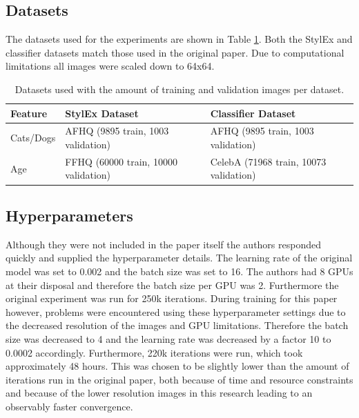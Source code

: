 \subsection{Datasets}

The datasets used for the experiments are shown in Table \ref{tab:datasets}. Both the StylEx and classifier datasets match those used in the original paper. Due to computational limitations all images were scaled down to 64x64.


\begin{table}[H] \centering
\begin{tabular}{|l|l|l|}
\hline
Feature & StylEx Dataset & Classifier Dataset \\
\hline
Cats/Dogs & AFHQ (9895 train, 1003 validation)\cite{AFHQ} & AFHQ (9895 train, 1003 validation) \\
\hline
Age & FFHQ (60000 train, 10000 validation) \cite{Karras_2019_CVPR} & CelebA (71968 train,  10073 validation) \cite{liu2015faceattributes} \\
\hline
\end{tabular}
\caption{Datasets used with the amount of training and validation images per dataset.}
\label{tab:datasets}
\end{table}

\subsection{Hyperparameters}
Although they were not included in the paper itself the authors responded quickly and supplied the hyperparameter details. The learning rate of the original model was set to 0.002 and the batch size was set to 16. The authors had 8 GPUs at their disposal and therefore the batch size per GPU was 2. Furthermore the original experiment was run for 250k iterations. During training for this paper however, problems were encountered using these hyperparameter settings due to the decreased resolution of the images and GPU limitations. Therefore the batch size was decreased to 4 and the learning rate was decreased by a factor 10 to 0.0002 accordingly. Furthermore, 220k iterations were run, which took approximately 48 hours. This was chosen to be slightly lower than the amount of iterations run in the original paper, both because of time and resource constraints and because of the lower resolution images in this research leading to an observably faster convergence.

